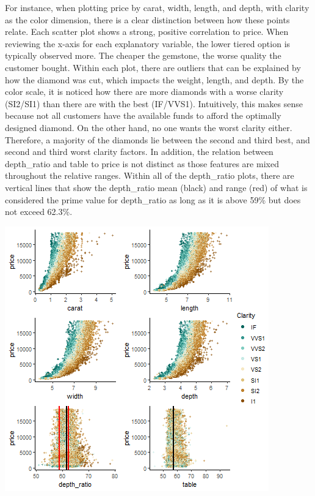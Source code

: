 \documentclass[
  paper=a4,
  ,captions=tableheading
]{scrartcl}
\begin{document}
For instance, when plotting price by carat, width, length, and depth,
with clarity as the color dimension, there is a clear distinction
between how these points relate. Each scatter plot shows a strong,
positive correlation to price. When reviewing the x-axis for each
explanatory variable, the lower tiered option is typically observed
more. The cheaper the gemstone, the worse quality the customer bought.
Within each plot, there are outliers that can be explained by how the
diamond was cut, which impacts the weight, length, and depth. By the
color scale, it is noticed how there are more diamonds with a worse
clarity (SI2/SI1) than there are with the best (IF/VVS1). Intuitively,
this makes sense because not all customers have the available funds to
afford the optimally designed diamond. On the other hand, no one wants
the worst clarity either. Therefore, a majority of the diamonds lie
between the second and third best, and second and third worst clarity
factors. In addition, the relation between depth\_ratio and table to
price is not distinct as those features are mixed throughout the
relative ranges. Within all of the depth\_ratio plots, there are
vertical lines that show the depth\_ratio mean (black) and range (red)
of what is considered the prime value for depth\_ratio as long as it is
above 59\% but does not exceed 62.3\%.

\begin{center}\includegraphics{Diamonds_PDF_files/figure-latex/Price by X and Clarity-1} \end{center}
\end{document}
